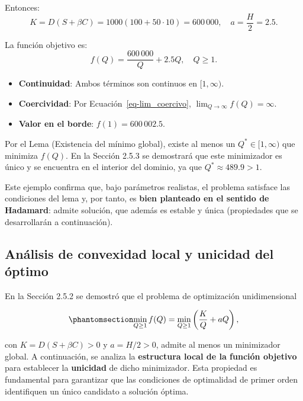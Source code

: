 \documentclass[
  spanish,
  us-letterpaper,
  DIV=11,
  numbers=noendperiod]{scrreprt}
\providecommand{\tightlist}{%
  \setlength{\itemsep}{0pt}\setlength{\parskip}{0pt}}
\numberwithin{equation}{section}
\begin{document}
Entonces: \[
K = D(S + \beta C) = 1000(100 + 50 \cdot 10) = 600\,000, \quad
a = \frac{H}{2} = 2.5.
\]

La función objetivo es: \[
f(Q) = \frac{600\,000}{Q} + 2.5 Q, \quad Q \geq 1.
\]

\begin{itemize}
\tightlist
\item
  \textbf{Continuidad}: Ambos términos son continuos en
  \([1, \infty)\).\\
\item
  \textbf{Coercividad}: Por Ecuación~\ref{eq-lim_coercivo},
  \(\lim_{Q \to \infty} f(Q) = \infty\).\\
\item
  \textbf{Valor en el borde}: \(f(1) = 600\,002.5\).
\end{itemize}

Por el Lema (Existencia del mínimo global), existe al menos un
\(Q^* \in [1, \infty)\) que minimiza \(f(Q)\). En la Sección 2.5.3 se
demostrará que este minimizador es único y se encuentra en el interior
del dominio, ya que \(Q^* \approx 489.9 > 1\).

Este ejemplo confirma que, bajo parámetros realistas, el problema
satisface las condiciones del lema y, por tanto, es \textbf{bien
planteado en el sentido de Hadamard}: admite solución, que además es
estable y única (propiedades que se desarrollarán a continuación).

\subsection{Análisis de convexidad local y unicidad del
óptimo}\label{anuxe1lisis-de-convexidad-local-y-unicidad-del-uxf3ptimo}

En la Sección 2.5.2 se demostró que el problema de optimización
unidimensional

\begin{equation}\phantomsection\label{eq-prob_25_2}{
\min_{Q \geq 1} f(Q) = \min_{Q \geq 1} \left( \frac{K}{Q} + a Q \right),
}\end{equation}

con \(K = D(S + \beta C) > 0\) y \(a = H/2 > 0\), admite al menos un
minimizador global. A continuación, se analiza la \textbf{estructura
local de la función objetivo} para establecer la \textbf{unicidad} de
dicho minimizador. Esta propiedad es fundamental para garantizar que las
condiciones de optimalidad de primer orden identifiquen un único
candidato a solución óptima.
\end{document}
